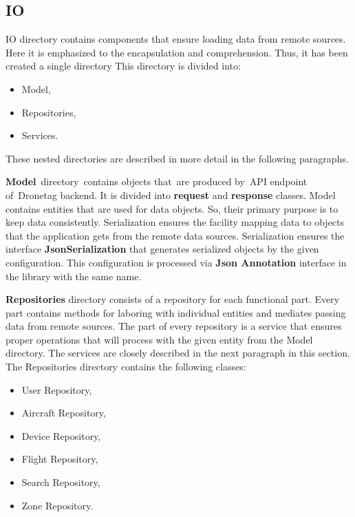 \subsection{IO}\label{subsec:io}
IO directory contains components that ensure loading data from remote sources.
Here it is emphasized to the encapsulation and comprehension.
Thus, it has been created a single directory
This directory is divided into:
\begin{itemize}
    \item Model,
    \item Repositories,
    \item Services.
\end{itemize}
These nested directories are described in more detail in the following paragraphs.

\textbf{Model}~directory~contains objects that~are produced by~API endpoint of~Dronetag backend.
It is divided into \textbf{request} and \textbf{response} classes.
Model contains entities that are used for data objects.
So, their primary purpose is to keep data consistently.
Serialization ensures the facility mapping data to objects that the application gets from the remote data sources.
Serialization ensures the interface \textbf{JsonSerialization} that generates serialized objects by the given configuration.
This configuration is processed via \textbf{Json Annotation} interface in the library with the same name.

\textbf{Repositories} directory consists of a repository for each functional part.
Every part contains methods for laboring with individual entities and mediates passing data from remote sources.
The part of every repository is a service that ensures proper operations that will process with the given entity from the Model directory.
The services are closely described in the next paragraph in this section.
The Repositories directory contains the following classes:
\begin{itemize}
    \item User Repository,
    \item Aircraft Repository,
    \item Device Repository,
    \item Flight Repository,
    \item Search Repository,
    \item Zone Repository.
\end{itemize}

